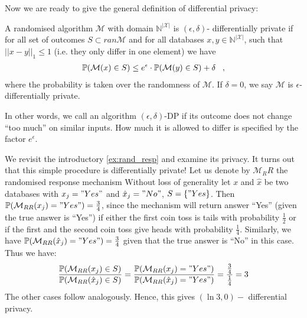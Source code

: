 Now we are ready to give the general definition of differential privacy:
\begin{definition} \label{def:dp}
    A randomised algorithm $\mathcal{M}$ with domain $\mathbb{N}^{|\mathcal{X}|}$ is $(\epsilon, \delta)$- differentially private if for all  set of outcomes $S \subset ran \mathcal{M}$ and for all databases $x,y \in \mathbb{N}^{|\mathcal{X}|}$, such that $||x-y||_1 \le 1$ (i.e. they only differ in one element) we have
    \begin{align}
        \mathbb{P}(\mathcal{M}(x) \in S) \le e^\epsilon \cdot \mathbb{P}(\mathcal{M}(y) \in S) + \delta \;\;\;,
    \end{align}
    where the probability is taken over the randomness of $\mathcal{M}$. If $\delta=0$, we say $\mathcal{M}$ is $\epsilon$-differentially private.
\end{definition}

In other words, we call an algorithm $(\epsilon, \delta)$-DP if its outcome does not change ``too much'' on similar inputs. How much it is allowed to differ is specified by the factor $e^\epsilon$.


\begin{ex}
    We revisit the introductory \cref{ex:rand_resp} and examine its privacy. It turns out that this simple procedure is differentially private! Let us denote by $\mathcal{M}_RR$ the randomised response mechanism Without loss of generality let $x$ and $\hat{x}$ be two databases with $x_j="Yes"$ and $\hat{x}_j="No"$, $S = \{"Yes\}$. Then $\mathbb{P}(\mathcal{M}_{RR}(x_j)= "Yes") = \frac{3}{4}$, since the mechanism will return answer ``Yes'' (given the true answer is ``Yes'') if either the first coin toss is tails with probability $\frac{1}{2}$ or if the first and the second coin toss give heads with probability $\frac{1}{4}$. Similarly, we have  $\mathbb{P}(\mathcal{M}_{RR}(\hat{x}_j)= "Yes") = \frac{3}{4}$ given that the true answer is ``No'' in this case. Thus we have:
    \begin{align}
        \frac{\mathbb{P}(\mathcal{M}_{RR}(x_j)\in S)}{\mathbb{P}(\mathcal{M}_{RR}(\hat{x}_j)\in S)} = \frac{\mathbb{P}(\mathcal{M}_{RR}(x_j)= "Yes")}{\mathbb{P}(\mathcal{M}_{RR}(\hat{x}_j)="Yes")} = \frac{\frac{3}{4}}{\frac{1}{4}} = 3
    \end{align} 
    The other cases follow analogously. Hence, this gives $(\ln 3, 0)-$ differential privacy.
\end{ex}

